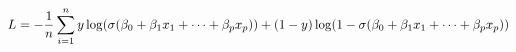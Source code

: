 \documentclass[preview]{standalone}
\begin{document}
\begin{align*}
\special{dvisvgm:raw <g id='unique000'>}L=-\frac{1}{n}\sum^n_{i=1}y\log(\sigma(\beta_0+\beta_1x_1+\cdots+\beta_px_p))+(1-y)\log(1-\sigma(\beta_0+\beta_1x_1+\cdots+\beta_px_p))\special{dvisvgm:raw </g>}
\end{align*}
\end{document}
